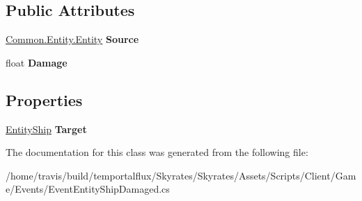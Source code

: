 \subsection*{Public Attributes}
\begin{DoxyCompactItemize}
\item 
\hypertarget{class_skyrates_1_1_client_1_1_game_1_1_event_1_1_event_entity_ship_damaged_a4cd32fb813a20f289425daf9c964d692}{\hyperlink{class_skyrates_1_1_common_1_1_entity_1_1_entity}{Common.\-Entity.\-Entity} {\bfseries Source}}\label{class_skyrates_1_1_client_1_1_game_1_1_event_1_1_event_entity_ship_damaged_a4cd32fb813a20f289425daf9c964d692}

\item 
\hypertarget{class_skyrates_1_1_client_1_1_game_1_1_event_1_1_event_entity_ship_damaged_a1e4d02b92dcb9e8b957e70c7857d96d7}{float {\bfseries Damage}}\label{class_skyrates_1_1_client_1_1_game_1_1_event_1_1_event_entity_ship_damaged_a1e4d02b92dcb9e8b957e70c7857d96d7}

\end{DoxyCompactItemize}
\subsection*{Properties}
\begin{DoxyCompactItemize}
\item 
\hypertarget{class_skyrates_1_1_client_1_1_game_1_1_event_1_1_event_entity_ship_damaged_abfb55cdb6205f8e4ecf35b8c93ae39b6}{\hyperlink{class_skyrates_1_1_client_1_1_entity_1_1_entity_ship}{Entity\-Ship} {\bfseries Target}}\label{class_skyrates_1_1_client_1_1_game_1_1_event_1_1_event_entity_ship_damaged_abfb55cdb6205f8e4ecf35b8c93ae39b6}

\end{DoxyCompactItemize}


The documentation for this class was generated from the following file\-:\begin{DoxyCompactItemize}
\item 
/home/travis/build/temportalflux/\-Skyrates/\-Skyrates/\-Assets/\-Scripts/\-Client/\-Game/\-Events/Event\-Entity\-Ship\-Damaged.\-cs\end{DoxyCompactItemize}
